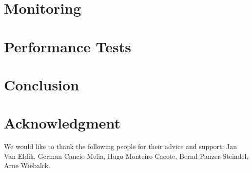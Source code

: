 \documentclass[10pt,twocolumn]{article}
\begin{document}
\section{Monitoring}
\label{s:mon}


\section{Performance Tests}
\label{s:performance}


\section{Conclusion}
\label{s:conclusion}


\section*{Acknowledgment}
We would like to thank the following people for their advice and support: 
Jan Van Eldik, German Cancio Melia, Hugo Monteiro Cacote, Bernd Panzer-Steindel, Arne Wiebalck.



\end{document}
